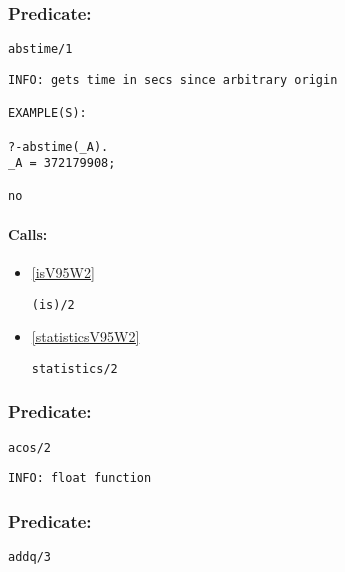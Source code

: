\subsubsection{Predicate:} \label{abstimeV95W1}

\begin{verbatim}
abstime/1
\end{verbatim}

{\small \begin{verbatim}
INFO: gets time in secs since arbitrary origin

EXAMPLE(S):

?-abstime(_A).
_A = 372179908;

no

\end{verbatim}}
\paragraph{Calls:} 
\begin{itemize}
\item \ref{isV95W2} 
\begin{verbatim}
(is)/2
\end{verbatim}

\item \ref{statisticsV95W2} 
\begin{verbatim}
statistics/2
\end{verbatim}

\end{itemize}

\subsubsection{Predicate:} \label{acosV95W2}

\begin{verbatim}
acos/2
\end{verbatim}

{\small \begin{verbatim}
INFO: float function

\end{verbatim}}

\subsubsection{Predicate:} \label{addqV95W3}

\begin{verbatim}
addq/3
\end{verbatim}

